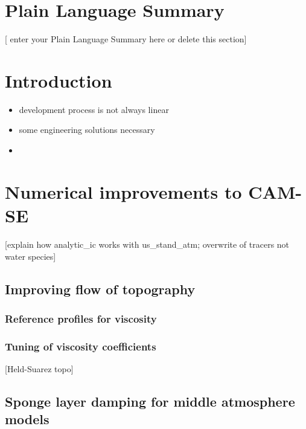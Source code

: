 \documentclass[draft]{agujournal2019}
\begin{document}
\section*{Plain Language Summary}
[ enter your Plain Language Summary here or delete this section]


%
%

\section{Introduction}
\begin{itemize}
\item development process is not always linear
\item some engineering solutions necessary
\item 
\end{itemize}
%


\section{Numerical improvements to CAM-SE}
[explain how analytic\_ic works with us\_stand\_atm; overwrite of tracers not water species]
\subsection{Improving flow of topography}
\subsubsection{Reference profiles for viscosity}
\subsubsection{Tuning of viscosity coefficients}
[Held-Suarez topo]
\subsection{Sponge layer damping for middle atmosphere models}
\end{document}
